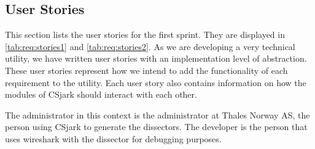 \subsection{User Stories}
\label{sec:req:stories1}
This section lists the user stories for the first sprint. They are displayed in \autoref{tab:req:stories1} and \autoref{tab:req:stories2}.
As we are developing a very technical \gls{utility}, we have written user stories with an implementation level of abstraction. 
These user stories represent how we intend to add the functionality of each requirement to the \gls{utility}.
Each user story also contains information on how the modules of CSjark should interact with each other.

The administrator in this context is the administrator at Thales Norway AS, the person using CSjark to generate the \glspl{dissector}. 
The developer is the person that uses \Gls{wireshark} with the \gls{dissector} for debugging purposes.

